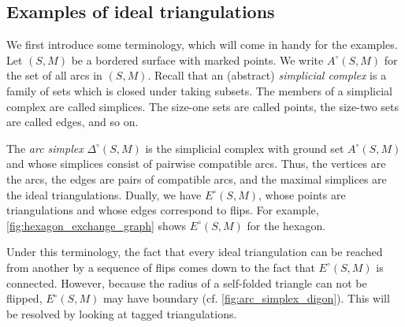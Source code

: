 \subsection{Examples of ideal triangulations}

We first introduce some terminology, which will come in handy for the examples. Let
$(S, M)$ be a bordered surface with marked points. We write $A^\circ(S, M)$ for the set of all arcs in $(S, M)$. Recall that an
(abstract) \emph{simplicial complex} is a family of sets
which is closed under taking subsets. The members of a simplicial complex are called
simplices. The size-one sets are called points, the size-two sets are called edges, and
so on.

The \emph{arc simplex} $\Delta^\circ (S, M)$ is the simplicial complex with ground set $A^\circ(S, M)$ and
whose simplices consist of pairwise compatible arcs. Thus, the vertices are the arcs,
the edges are pairs of compatible arcs, and the maximal simplices are the ideal
triangulations. Dually, we have $E^\circ(S, M)$,
whose points are triangulations and whose edges correspond to flips. For example,
\cref{fig:hexagon_exchange_graph} shows $E^\circ(S, M)$ for the hexagon.

Under this terminology, the fact that every ideal triangulation can be reached from
another by a sequence of flips comes down to the fact that $E^\circ(S,M)$ is connected.
However, because the radius of a self-folded triangle can not be flipped, $E^\circ(S,
	M)$ may have boundary (cf. \cref{fig:arc_simplex_digon}). This will be resolved by
looking at tagged triangulations.

